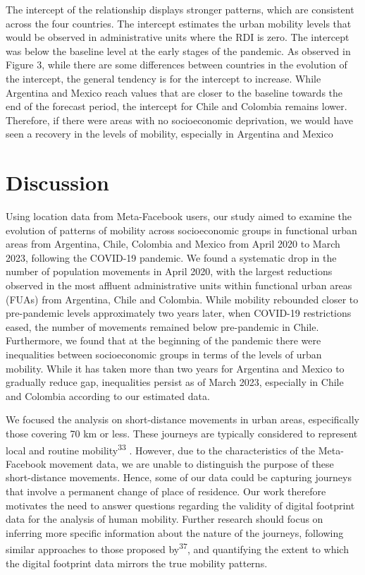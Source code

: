 \documentclass[
  11pt,
]{article}
\begin{document}
The intercept of the relationship displays stronger patterns, which are
consistent across the four countries. The intercept estimates the urban
mobility levels that would be observed in administrative units where the
RDI is zero. The intercept was below the baseline level at the early
stages of the pandemic. As observed in Figure 3, while there are some
differences between countries in the evolution of the intercept, the
general tendency is for the intercept to increase. While Argentina and
Mexico reach values that are closer to the baseline towards the end of
the forecast period, the intercept for Chile and Colombia remains lower.
Therefore, if there were areas with no socioeconomic deprivation, we
would have seen a recovery in the levels of mobility, especially in
Argentina and Mexico

\hypertarget{sec-discussion}{%
\section{Discussion}\label{sec-discussion}}

Using location data from Meta-Facebook users, our study aimed to examine
the evolution of patterns of mobility across socioeconomic groups in
functional urban areas from Argentina, Chile, Colombia and Mexico from
April 2020 to March 2023, following the COVID-19 pandemic. We found a
systematic drop in the number of population movements in April 2020,
with the largest reductions observed in the most affluent administrative
units within functional urban areas (FUAs) from Argentina, Chile and
Colombia. While mobility rebounded closer to pre-pandemic levels
approximately two years later, when COVID-19 restrictions eased, the
number of movements remained below pre-pandemic in Chile. Furthermore,
we found that at the beginning of the pandemic there were inequalities
between socioeconomic groups in terms of the levels of urban mobility.
While it has taken more than two years for Argentina and Mexico to
gradually reduce gap, inequalities persist as of March 2023, especially
in Chile and Colombia according to our estimated data.

We focused the analysis on short-distance movements in urban areas,
especifically those covering 70 km or less. These journeys are typically
considered to represent local and routine mobility\textsuperscript{33} .
However, due to the characteristics of the Meta-Facebook movement data,
we are unable to distinguish the purpose of these short-distance
movements. Hence, some of our data could be capturing journeys that
involve a permanent change of place of residence. Our work therefore
motivates the need to answer questions regarding the validity of digital
footprint data for the analysis of human mobility. Further research
should focus on inferring more specific information about the nature of
the journeys, following similar approaches to those proposed
by\textsuperscript{37}, and quantifying the extent to which the digital
footprint data mirrors the true mobility patterns.
\end{document}
